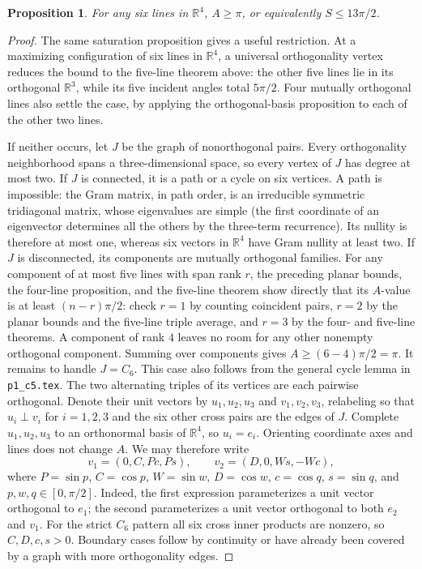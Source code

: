 \documentclass[11pt]{article}
\newtheorem{proposition}{Proposition}
\begin{document}
\begin{proposition}
For any six lines in $\mathbb R^4$, $A\geq\pi$, or equivalently
$S\leq13\pi/2$.
\end{proposition}
\begin{proof}
The same saturation proposition gives a useful restriction.  At a
maximizing configuration of six lines in $\mathbb R^4$, a universal
orthogonality vertex reduces the bound to the five-line theorem above:
the other five lines lie in its orthogonal $\mathbb R^3$, while its
five incident angles total $5\pi/2$.  Four mutually orthogonal
lines also settle the case, by applying the orthogonal-basis
proposition to each of the other two lines.

If neither occurs, let $J$ be the graph of nonorthogonal pairs.
Every orthogonality neighborhood spans a three-dimensional space,
so every vertex of $J$ has degree at most two.  If $J$ is connected,
it is a path or a cycle on six vertices.  A path is impossible:
the Gram matrix, in path order, is an irreducible symmetric
tridiagonal matrix, whose eigenvalues are simple (the first
coordinate of an eigenvector determines all the others by the
three-term recurrence).  Its nullity is therefore at most one,
whereas six vectors in $\mathbb R^4$ have Gram nullity at least two.
If $J$ is disconnected, its components are mutually orthogonal
families.  For any component of at most five lines with span rank
$r$, the preceding planar bounds, the four-line proposition, and
the five-line theorem show directly that its $A$-value is at least
$(n-r)\pi/2$: check $r=1$ by counting coincident pairs, $r=2$
by the planar bounds and the five-line triple average, and
$r=3$ by the four- and five-line theorems.  A component of rank
$4$ leaves no room for any other nonempty orthogonal component.
Summing over components gives $A\geq(6-4)\pi/2=\pi$.
It remains to handle $J=C_6$.
This case also follows from the general cycle lemma in \texttt{p1\_c5.tex}.
The two alternating triples of its
vertices are each pairwise orthogonal.  Denote their unit vectors by
$u_1,u_2,u_3$ and $v_1,v_2,v_3$, relabeling so that
$u_i\perp v_i$ for $i=1,2,3$ and the six other cross pairs are the
edges of $J$.  Complete $u_1,u_2,u_3$ to an orthonormal basis of
$\mathbb R^4$, so $u_i=e_i$.  Orienting coordinate axes and lines
does not change $A$.  We may therefore write
\[
 v_1=(0,C,Pc,Ps),\qquad
 v_2=(D,0,Ws,-Wc),
\]
where $P=\sin p$, $C=\cos p$, $W=\sin w$, $D=\cos w$,
$c=\cos q$, $s=\sin q$, and $p,w,q\in[0,\pi/2]$.
Indeed, the first expression parameterizes a unit vector orthogonal
to $e_1$; the second parameterizes a unit vector orthogonal to
both $e_2$ and $v_1$.  For the strict $C_6$ pattern all six cross
inner products are nonzero, so $C,D,c,s>0$.  Boundary cases follow
by continuity or have already been covered by a graph with more
orthogonality edges.


\end{proof}
\end{document}
